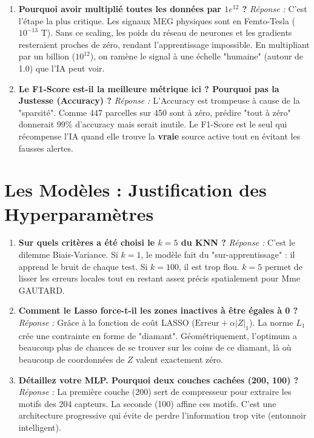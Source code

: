 \documentclass[a4paper,12pt]{article}
\begin{document}
\begin{enumerate}[label=\textbf{Q\arabic* :}, leftmargin=1.5cm, resume]
    \item \textbf{Pourquoi avoir multiplié toutes les données par \(1e^{12}\) ?}
    \textit{Réponse :} C'est l'étape la plus critique. Les signaux MEG physiques sont en Femto-Tesla (\(10^{-13}\) T). Sans ce scaling, les poids du réseau de neurones et les gradients resteraient proches de zéro, rendant l'apprentissage impossible. En multipliant par un billion (\(10^{12}\)), on ramène le signal à une échelle "humaine" (autour de 1.0) que l'IA peut voir.

    \item \textbf{Le F1-Score est-il la meilleure métrique ici ? Pourquoi pas la Justesse (Accuracy) ?}
    \textit{Réponse :} L'Accuracy est trompeuse à cause de la "sparsité". Comme 447 parcelles sur 450 sont à zéro, prédire "tout à zéro" donnerait 99\% d'accuracy mais serait inutile. Le F1-Score est le seul qui récompense l'IA quand elle trouve la \textbf{vraie} source active tout en évitant les fausses alertes.
\end{enumerate}

\section{Les Modèles : Justification des Hyperparamètres}

\begin{enumerate}[label=\textbf{Q\arabic* :}, leftmargin=1.5cm, resume]
    \item \textbf{Sur quels critères a été choisi le \(k=5\) du KNN ?}
    \textit{Réponse :} C'est le dilemme Biais-Variance. Si \(k=1\), le modèle fait du "sur-apprentissage" : il apprend le bruit de chaque test. Si \(k=100\), il est trop flou. \(k=5\) permet de lisser les erreurs locales tout en restant assez précis spatialement pour Mme GAUTARD.

    \item \textbf{Comment le Lasso force-t-il les zones inactives à être égales à 0 ?}
    \textit{Réponse :} Grâce à la fonction de coût LASSO (\(\text{Erreur} + \alpha |Z|_1\)). La norme \(L_1\) crée une contrainte en forme de "diamant". Géométriquement, l'optimum a beaucoup plus de chances de se trouver sur les coins de ce diamant, là où beaucoup de coordonnées de \(Z\) valent exactement zéro.

    \item \textbf{Détaillez votre MLP. Pourquoi deux couches cachées (200, 100) ?}
    \textit{Réponse :} La première couche (200) sert de compresseur pour extraire les motifs des 204 capteurs. La seconde (100) affine ces motifs. C'est une architecture progressive qui évite de perdre l'information trop vite (entonnoir intelligent).
\end{enumerate}
\end{document}
